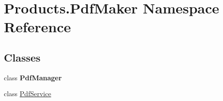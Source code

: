 \hypertarget{namespace_products_1_1_pdf_maker}{}\section{Products.\+Pdf\+Maker Namespace Reference}
\label{namespace_products_1_1_pdf_maker}
\subsection*{Classes}
\begin{DoxyCompactItemize}
\item 
class {\bfseries Pdf\+Manager}
\item 
class \hyperlink{class_products_1_1_pdf_maker_1_1_pdf_service}{Pdf\+Service}
\end{DoxyCompactItemize}
